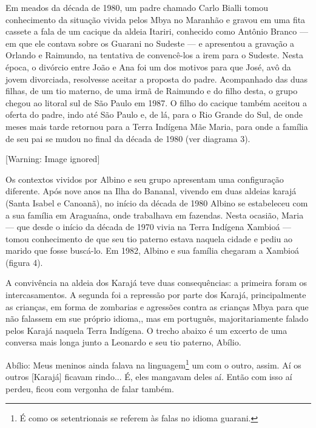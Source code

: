 \documentclass{article}
\begin{document}
Em meados da d\'ecada de 1980, um padre chamado Carlo Bialli tomou
conhecimento da situa\c{c}\~ao vivida pelos Mbya no Maranh\~ao e gravou
em uma fita cassete a fala de um cacique da aldeia Itariri, conhecido
como Ant\^onio Branco --- em que ele contava sobre os Guarani no
Sudeste --- e apresentou a grava\c{c}\~ao a Orlando e Raimundo, na
tentativa de convenc\^e-los a irem para o Sudeste. Nesta \'epoca, o
div\'orcio entre Jo\~ao e Ana foi um dos motivos para que Jos\'e, av\^o
da jovem divorciada, resolvesse aceitar a proposta do padre.
Acompanhado das duas filhas, de um tio materno, de uma irm\~a de
Raimundo e do filho desta, o grupo chegou ao litoral sul de S\~ao Paulo
em 1987. O filho do cacique tamb\'em aceitou a oferta do padre, indo
at\'e S\~ao Paulo e, de l\'a, para o Rio Grande do Sul, de onde meses
mais tarde retornou para a Terra Ind\'igena M\~ae Maria, para onde a
fam\'ilia de seu pai se mudou no final da d\'ecada de 1980 (ver
diagrama 3).

  [Warning: Image ignored] %
 

Os contextos vividos por Albino e seu grupo apresentam uma
configura\c{c}\~ao diferente. Ap\'os nove anos na Ilha do Bananal,
vivendo em duas aldeias karaj\'a (Santa Isabel e Canoan\~a), no
in\'icio da d\'ecada de 1980 Albino se estabeleceu com a sua fam\'ilia
em Aragua\'ina, onde trabalhava em fazendas. Nesta ocasi\~ao, Maria ---
que desde o in\'icio da d\'ecada de 1970 vivia na Terra Ind\'igena
Xambio\'a --- tomou conhecimento de que seu tio paterno estava naquela
cidade e pediu ao marido que fosse busc\'a-lo. Em 1982, Albino e sua
fam\'ilia chegaram a Xambio\'a (figura 4). 

A conviv\^encia na aldeia dos Karaj\'a teve duas consequ\^encias: a
primeira foram os intercasamentos. A segunda foi a repress\~ao por
parte dos Karaj\'a, principalmente as crian\c{c}as, em forma de
zombarias e agress\~oes contra as crian\c{c}as Mbya para que n\~ao
falassem em sue pr\'oprio idioma,, mas em portugu\^es, majoritariamente
falado pelos Karaj\'a naquela Terra Ind\'igena. O trecho abaixo \'e um
excerto de uma conversa mais longa junto a Leonardo e seu tio paterno,
Ab\'ilio. 

Ab\'ilio: Meus meninos ainda falava na linguagem\footnote{ \'E como os
setentrionais se referem \`as falas no idioma guarani.} um com o outro,
assim. A\'i os outros [Karaj\'a] ficavam rindo... \'E, eles mangavam
deles a\'i. Ent\~ao com isso a\'i perdeu, ficou com vergonha de falar
tamb\'em.
\end{document}
